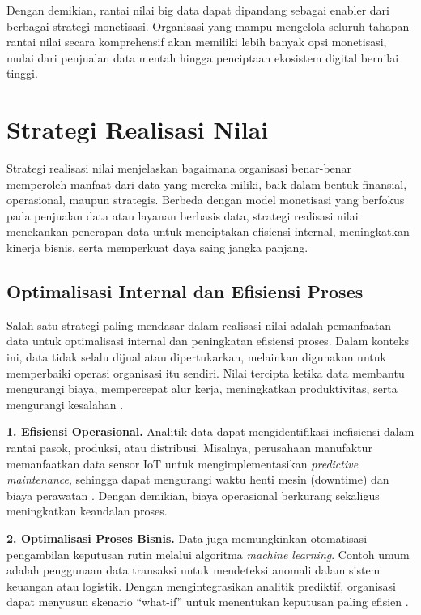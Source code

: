 Dengan demikian, rantai nilai big data dapat dipandang sebagai enabler dari berbagai strategi monetisasi. Organisasi yang mampu mengelola seluruh tahapan rantai nilai secara komprehensif akan memiliki lebih banyak opsi monetisasi, mulai dari penjualan data mentah hingga penciptaan ekosistem digital bernilai tinggi.


\section{Strategi Realisasi Nilai}

Strategi realisasi nilai menjelaskan bagaimana organisasi benar-benar memperoleh manfaat dari data yang mereka miliki, baik dalam bentuk finansial, operasional, maupun strategis. Berbeda dengan model monetisasi yang berfokus pada penjualan data atau layanan berbasis data, strategi realisasi nilai menekankan penerapan data untuk menciptakan efisiensi internal, meningkatkan kinerja bisnis, serta memperkuat daya saing jangka panjang.

\subsection{Optimalisasi Internal dan Efisiensi Proses}

Salah satu strategi paling mendasar dalam realisasi nilai adalah pemanfaatan data untuk optimalisasi internal dan peningkatan efisiensi proses. Dalam konteks ini, data tidak selalu dijual atau dipertukarkan, melainkan digunakan untuk memperbaiki operasi organisasi itu sendiri. Nilai tercipta ketika data membantu mengurangi biaya, mempercepat alur kerja, meningkatkan produktivitas, serta mengurangi kesalahan \cite{mcafee2012, wamba2017}.

\textbf{1. Efisiensi Operasional.}  
Analitik data dapat mengidentifikasi inefisiensi dalam rantai pasok, produksi, atau distribusi. Misalnya, perusahaan manufaktur memanfaatkan data sensor IoT untuk mengimplementasikan \textit{predictive maintenance}, sehingga dapat mengurangi waktu henti mesin (downtime) dan biaya perawatan \cite{fernandez2020}. Dengan demikian, biaya operasional berkurang sekaligus meningkatkan keandalan proses.

\textbf{2. Optimalisasi Proses Bisnis.}  
Data juga memungkinkan otomatisasi pengambilan keputusan rutin melalui algoritma \textit{machine learning}. Contoh umum adalah penggunaan data transaksi untuk mendeteksi anomali dalam sistem keuangan atau logistik. Dengan mengintegrasikan analitik prediktif, organisasi dapat menyusun skenario “what-if” untuk menentukan keputusan paling efisien \cite{davenport2010analytics}.

